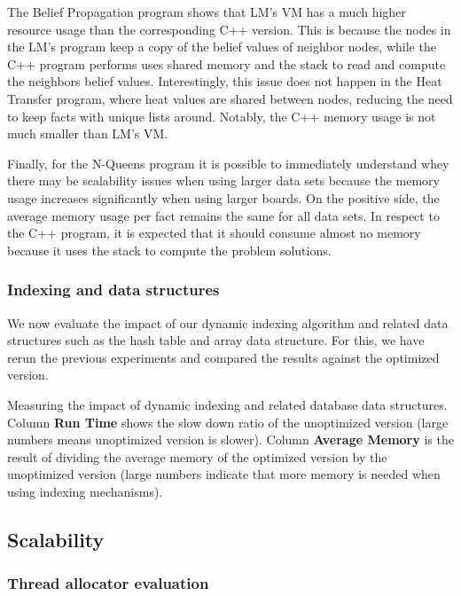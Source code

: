 The Belief Propagation program shows that LM's VM has a much higher resource
usage than the corresponding C++ version. This is because the nodes in the LM's
program keep a copy of the belief values of neighbor nodes, while the C++
program performs uses shared memory and the stack to read and compute the
neighbors belief values. Interestingly, this issue does not happen in the Heat
Transfer program, where heat values are shared between nodes, reducing the need
to keep facts with unique lists around. Notably, the C++ memory usage is not
much smaller than LM's VM.

Finally, for the N-Queens program it is possible to immediately understand whey
there may be scalability issues when using larger data sets because the memory
usage increases significantly when using larger boards. On the positive side,
the average memory usage per fact remains the same for all data sets. In respect
to the C++ program, it is expected that it should consume almost no memory
because it uses the stack to compute the problem solutions.

\subsubsection{Indexing and data structures}

We now evaluate the impact of our dynamic indexing algorithm and related data
structures such as the hash table and array data structure. For this, we have
rerun the previous experiments and compared the results against the optimized
version.

\begin{table}[ht]
   \begin{center}
      
   \end{center}
   \caption{Measuring the impact of dynamic indexing and related database data
      structures. Column \textbf{Run Time} shows the slow down ratio of the
      unoptimized version (large numbers means unoptimized version is slower).
      Column \textbf{Average Memory} is the result of dividing the average
      memory of the optimized version by the unoptimized version (large numbers
      indicate that more memory is needed when using indexing mechanisms).}
   \label{table:implementation:compare_absolute}
\end{table}


\subsection{Scalability}

\subsubsection{Thread allocator evaluation}

